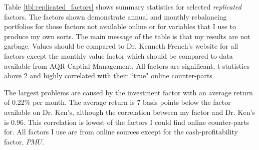 
Table \ref{tbl:replicated_factors} shows summary statistics for selected \emph{replicated}
factors. The factors shown demonstrate annual and monthly rebalancing portfolios for those
factors not available online or for variables that I use to produce my own sorts. The main
message of the table is that my results are not garbage. Values should be compared to Dr.
Kenneth French's website for all factors except the monthly value factor which should be
compared to data available from AQR Captial Management. All factors are significant,
t-statistics above 2 and highly correlated with their ``true" online counter-parts.

The largest problems are caused by the investment factor with an average return of 0.22\%
per month. The average return is 7 basis points below the factor available on Dr.
Ken's, although the correlation between my factor and Dr. Ken's is 0.96. This correlation
is lowest of the factors I could find online counter-parts for. All factors I use are from
online sources except for the cash-profitability factor, $PMU$.
